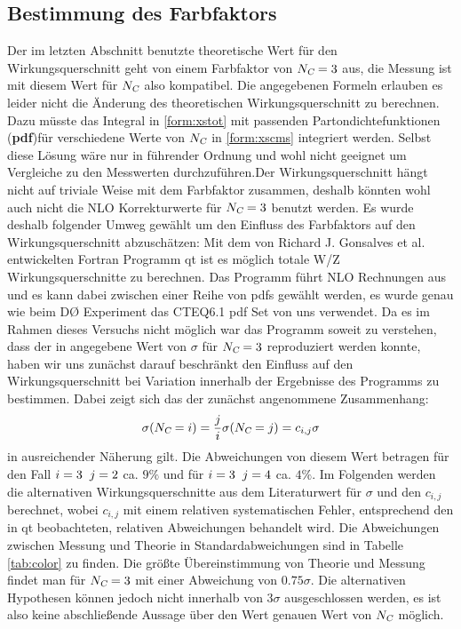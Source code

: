 \documentclass[a4paper,12pt]{article}
\begin{document}
\subsection{Bestimmung des Farbfaktors}
Der im letzten Abschnitt benutzte theoretische Wert für den Wirkungsquerschnitt geht von einem Farbfaktor von $N_{\textsl{C}}=3$ aus, die
Messung ist mit diesem Wert für $N_{\textsl{C}}$ also kompatibel. Die angegebenen Formeln erlauben es leider nicht die Änderung des theoretischen
Wirkungsquerschnitt zu berechnen. Dazu müsste das Integral in \ref{form:xstot} mit passenden  Partondichtefunktionen (\textbf{pdf})für verschiedene Werte
von $N_{\textsl{C}}$ in \ref{form:xscms} integriert werden. Selbst diese Lösung wäre nur in führender Ordnung und wohl nicht geeignet um Vergleiche
zu den Messwerten durchzuführen.Der Wirkungsquerschnitt hängt nicht auf triviale Weise mit dem Farbfaktor zusammen, deshalb könnten wohl auch nicht die
NLO Korrekturwerte für $N_{\textsl{C}}=3$ benutzt werden. Es wurde deshalb folgender Umweg gewählt um den Einfluss des Farbfaktors auf den
Wirkungsquerschnitt abzuschätzen:
Mit dem von Richard J. Gonsalves et al. entwickelten Fortran Programm qt \cite{qtsite} ist es möglich totale W/Z  Wirkungsquerschnitte
zu berechnen. Das Programm führt NLO Rechnungen aus und es kann dabei zwischen einer Reihe von pdfs gewählt werden, es wurde genau wie beim
DØ Experiment \cite{Abachi:1996ey} das CTEQ6.1 pdf Set von uns verwendet. Da es im Rahmen dieses Versuchs nicht möglich war das Programm
soweit zu verstehen, dass der in \cite{versuchsanleitung} angegebene Wert von $\sigma$ für $N_{\textsl{C}}=3$ reproduziert werden konnte, haben
wir uns zunächst darauf beschränkt den Einfluss auf den Wirkungsquerschnitt bei Variation innerhalb der Ergebnisse des Programms zu bestimmen.
Dabei zeigt sich das der zunächst angenommene Zusammenhang:
  \begin{align*}
	  \sigma (N_{\textsl{C}}= i) = \frac{j}{i} \sigma (N_{\textsl{C}}= j) = c_{i,j} \sigma
  \end{align*}
in ausreichender Näherung gilt. Die Abweichungen von diesem Wert betragen für den Fall $i=3 \hspace{0.2cm} j=2$ ca. $9\% $ und für $i=3 \hspace{0.2cm} j=4$
ca. $4\% $. Im Folgenden werden die alternativen Wirkungsquerschnitte aus dem Literaturwert für $\sigma $ und den $c_{i,j}$ berechnet,
wobei $c_{i,j}$ mit einem relativen systematischen Fehler, entsprechend den in qt beobachteten, relativen Abweichungen behandelt wird.
 Die Abweichungen zwischen Messung und Theorie in Standardabweichungen sind in Tabelle \ref{tab:color} zu finden. Die größte Übereinstimmung
 von Theorie und Messung findet man für $N_{\textsl{C}}= 3$ mit einer Abweichung von $0.75\sigma$. Die alternativen Hypothesen können jedoch
 nicht innerhalb von $3\sigma$ ausgeschlossen werden, es ist also keine abschließende Aussage über den Wert genauen Wert von $N_{\textsl{C}}$ möglich.
\end{document}
